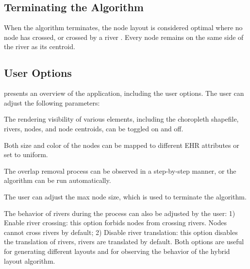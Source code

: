 
\subsection{Terminating the Algorithm}


When the algorithm terminates, the node layout is considered optimal where no node has crossed, or crossed by a river . Every node remains on the same side of the river as its centroid.

\subsection{User Options}

 presents an overview of the application, including the user options. The user can adjust the following parameters:

 The rendering visibility of various elements, including the choropleth shapefile, rivers, nodes, and node centroids, can be toggled on and off.

 Both size and color of the nodes can be mapped to different EHR attributes or set to uniform.

 The overlap removal process can be observed in a step-by-step manner, or the algorithm can be run automatically. 

 The user can adjust the max node size, which is used to terminate the algorithm.

 The behavior of rivers during the process can also be adjusted by the user: 1) Enable river crossing: this option forbids nodes from crossing rivers. Nodes cannot cross rivers by default; 2) Disable river translation: this option disables the translation of rivers, rivers are translated by default. Both options are useful for generating different layouts and for observing the behavior of the hybrid layout algorithm.

